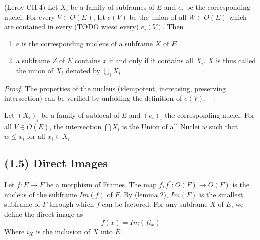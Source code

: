 \begin{lemma}
(Leroy CH 4)
    \label{lem:sublocal_union}
    \leanok
    Let $X_i$ be a family of subframes of $E$ and $e_i$ be the corresponding nuclei. For every $V \in O(E)$, let
    $e(V)$ be the union of all $W \in O(E)$ which are contained in every (TODO wieso every) $e_i(V)$. Then \\
    \begin{enumerate}
        \item $e$ is the corresponding nucleus of a subframe $X$ of $E$
        \item a subframe $Z$ of $E$ contains $x$ if and only if it contains all $X_i$. $X$ is thus called the union of
        $X_i$ denoted by $\bigcup_i X_i$
    \end{enumerate}
\end{lemma}
\begin{proof}
    The properties of the nucleus (idempotent, increasing, preserving intersection) can be verified by unfolding the
    definition of $e(V)$.
    \leanok
\end{proof}


\begin{definition}
    \label{def:sublocal_intersection}
    \leanok
    Let $(X_i)_i$ be a family of sublocal of $E$ and $(e_i)_i$ the corresponding nuclei.
    For all $V \in O(E)$, the intersection $\bigcap X_i$ is the Union of all Nuclei $w$ such that $w \le x_i $ for all $x_i \in X_i $
\end{definition}

\subsection{(1.5) Direct Images}

\begin{definition}
    \label{def:direct_images}
    Let $f : E \rightarrow F$ be a morphism of Frames. The map $f_*f^* : O(F) \to O(F)$ is the nucleus of the subframe
    $Im(f)$ of $F$. By (lemma 2), $Im(F)$ is the smallest subframe of $F$ through which $f$ can be factored. For any subframe $X$ of $E$, we define the direct image as
    \[f(x) = Im(fi_x)\]
    Where $i_X$ is the inclusion of $X$ into $E$.
\end{definition}

